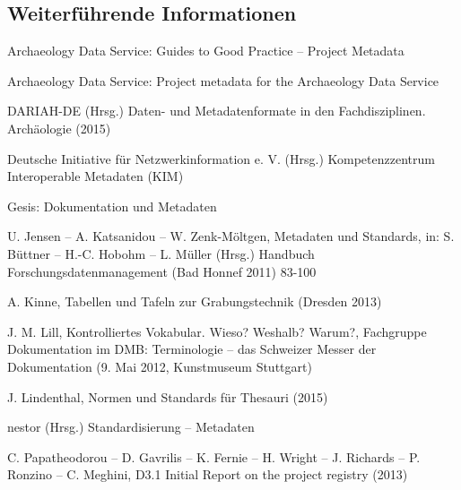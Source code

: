 \newpage
\subsection{Weiterführende Informationen}
\begin{flushleft}
Archaeology Data Service: Guides to Good Practice -- Project Metadata 

Archaeology Data Service: Project metadata for the Archaeology Data Service 

DARIAH-DE (Hrsg.) Daten- und Metadatenformate in den Fachdisziplinen. Archäologie (2015) 

Deutsche Initiative für Netzwerkinformation e. V. (Hrsg.) Kompetenzzentrum Interoperable Metadaten (KIM) 

Gesis: Dokumentation und Metadaten 

U. Jensen -- A. Katsanidou -- W. Zenk-Möltgen, Metadaten und Standards, in: S. Büttner -- H.-C. Hobohm -- L. Müller (Hrsg.) Handbuch Forschungsdatenmanagement (Bad Honnef 2011) 83-100 

A. Kinne, Tabellen und Tafeln zur Grabungstechnik (Dresden 2013)\abstand

J. M. Lill, Kontrolliertes Vokabular. Wieso? Weshalb? Warum?, Fachgruppe Dokumentation im DMB: Terminologie -- das Schweizer Messer der Dokumentation (9. Mai 2012, Kunstmuseum Stuttgart) 

J. Lindenthal, Normen und Standards für Thesauri (2015) 

nestor (Hrsg.) Standardisierung -- Metadaten 

C. Papatheodorou -- D. Gavrilis -- K. Fernie -- H. Wright -- J. Richards -- P. Ronzino -- C. Meghini, D3.1 Initial Report on the project registry (2013)


\end{flushleft}
